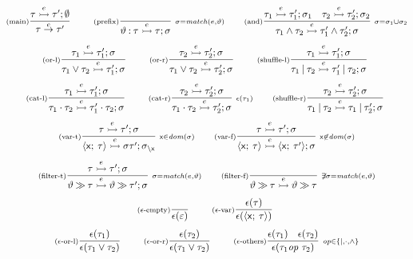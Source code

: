 \begin{gather*}
\Rule{main}
{\tau\extrans{\ev}\tau';\emptyset}
{\tau\trans{\ev}\tau'}
{}
\qquad
\Rule{prefix}
{}
{\eventTy\prefixop\tau\extrans{\ev}\tau;\subs}
{
  \subs=\mtch(\ev,\eventTy)
}
\qquad
\Rule{and}
{\tau_1\extrans{\ev}\tau'_1;\subs_1\quad\tau_2\extrans{\ev}\tau'_2;\subs_2}
{\tau_1\andop\tau_2\extrans{\ev}\tau'_1\andop\tau'_2;\subs}
{\subs=\subs_1\subsMerge\subs_2}
\\[1ex]
\Rule{or-l}
{\tau_1\extrans{\ev}\tau'_1;\subs}
{\tau_1\orop\tau_2\extrans{\ev}\tau'_1;\subs}
{}
\qquad
\Rule{or-r}
{\tau_2\extrans{\ev}\tau'_2;\subs}
{\tau_1\orop\tau_2\extrans{\ev}\tau'_2;\subs}
{}
\qquad
\Rule{shuffle-l}
{\tau_1\extrans{\ev}\tau'_1;\subs}
{\tau_1\shuffleop\tau_2\extrans{\ev}\tau'_1\shuffleop\tau_2;\subs}
{}
\\[1ex]
\Rule{cat-l}
{\tau_1\extrans{\ev}\tau'_1;\subs}
{\tau_1\catop\tau_2\extrans{\ev}\tau'_1\catop\tau_2;\subs}
{}
\qquad
\Rule{cat-r}
{\tau_2\extrans{\ev}\tau'_2;\subs}
{\tau_1\catop\tau_2\extrans{\ev}\tau'_2;\subs}
{\isEmpty(\tau_1)}
\qquad
\Rule{shuffle-r}
{\tau_2\extrans{\ev}\tau'_2;\subs}
{\tau_1\shuffleop\tau_2\extrans{\ev}\tau_1\shuffleop\tau'_2;\subs}
{}
\\[1ex]
\Rule{var-t}
{\tau\extrans{\ev}\tau';\subs}
{\var{\xv}{\tau}\extrans{\ev}\subs\tau';\restrict{\subs}{\xv}}
{\xv\in\dom(\subs)}
\qquad
\Rule{var-f}
{\tau\extrans{\ev}\tau';\subs}
{\var{\xv}{\tau}\extrans{\ev}\var{\xv}{\tau'};\subs}
{\xv\not\in\dom(\subs)}
\\[1ex]
\Rule{filter-t}
{\tau\extrans{\ev}\tau';\subs}
{\eventTy \filterop \tau \extrans{\ev} \eventTy \filterop \tau';\subs}
{\subs=\mtch(\ev,\eventTy)}
\qquad
\Rule{filter-f}
{}
{\eventTy \filterop \tau \extrans{\ev} \eventTy \filterop \tau}
{\not\exists\subs=\mtch(\ev,\eventTy)}
\\[1ex]
\Rule{$\isEmpty$-empty}
{}
{\isEmpty(\emptyseq)}
{}
\qquad
\Rule{$\isEmpty$-var}
{\isEmpty(\tau)}
{\isEmpty(\var{\xv}{\tau})}
{}
\\[1ex]
\Rule{$\isEmpty$-or-l}
{\isEmpty(\tau_1)}
{\isEmpty(\tau_1\orop\tau_2)}
{}
\qquad
\Rule{$\isEmpty$-or-r}
{\isEmpty(\tau_2)}
{\isEmpty(\tau_1\orop\tau_2)}
{}
\qquad
\Rule{$\isEmpty$-others}
{\isEmpty(\tau_1)\quad\isEmpty(\tau_2)}
{\isEmpty(\tau_1 \op\ \tau_2)}
{\op\in\{\shuffleop,\catop,\andop\}}
\end{gather*}
